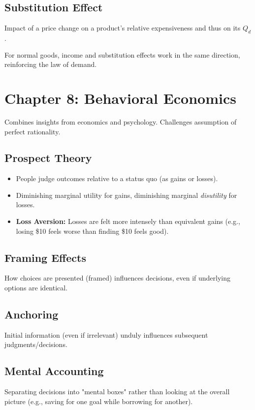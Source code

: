 \documentclass{article}
\begin{document}
\subsection*{Substitution Effect}
Impact of a price change on a product's relative expensiveness and thus on its $Q_d$.

For normal goods, income and substitution effects work in the same direction, reinforcing the law of demand.

\section*{Chapter 8: Behavioral Economics}

Combines insights from economics and psychology. Challenges assumption of perfect rationality.

\subsection*{Prospect Theory}
\begin{itemize}
    \item People judge outcomes relative to a status quo (as gains or losses).
    \item Diminishing marginal utility for gains, diminishing marginal \textit{disutility} for losses.
    \item \textbf{Loss Aversion:} Losses are felt more intensely than equivalent gains (e.g., losing \$10 feels worse than finding \$10 feels good).
\end{itemize}

\subsection*{Framing Effects}
How choices are presented (framed) influences decisions, even if underlying options are identical.

\subsection*{Anchoring}
Initial information (even if irrelevant) unduly influences subsequent judgments/decisions.

\subsection*{Mental Accounting}
Separating decisions into "mental boxes" rather than looking at the overall picture (e.g., saving for one goal while borrowing for another).
\end{document}
